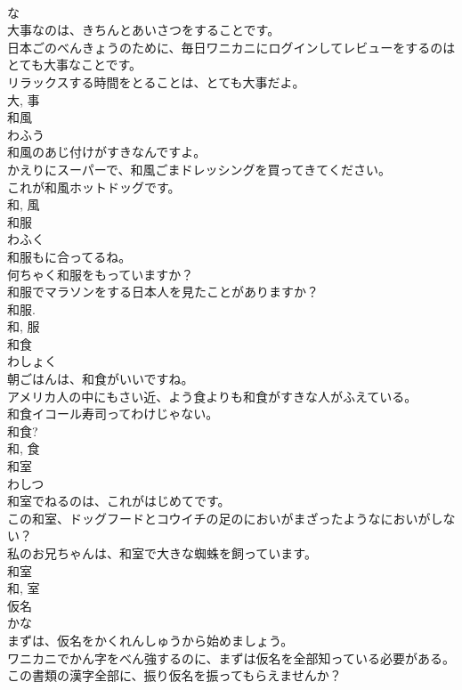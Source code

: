 \documentclass[8pt]{extreport}
\begin{document}
\begin{CJK}{UTF8}{min}
\\	な 
\\	大事なのは、きちんとあいさつをすることです。	
\\	日本ごのべんきょうのために、毎日ワニカニにログインしてレビューをするのはとても大事なことです。	
\\	リラックスする時間をとることは、とても大事だよ。	
\\	大, 事	
\\	和風	
\\	わふう	
\\	和風のあじ付けがすきなんですよ。	
\\	かえりにスーパーで、和風ごまドレッシングを買ってきてください。	
\\	これが和風ホットドッグです。	
\\	和, 風	
\\	和服	
\\	わふく	
\\	和服もに合ってるね。	
\\	何ちゃく和服をもっていますか？	
\\	和服でマラソンをする日本人を見たことがありますか？	
\\	和服.	
\\	和, 服	
\\	和食	
\\	わしょく	
\\	朝ごはんは、和食がいいですね。	
\\	アメリカ人の中にもさい近、よう食よりも和食がすきな人がふえている。	
\\	和食イコール寿司ってわけじゃない。	
\\	和食?
\\	和, 食	
\\	和室	
\\	わしつ	
\\	和室でねるのは、これがはじめてです。	
\\	この和室、ドッグフードとコウイチの足のにおいがまざったようなにおいがしない？	
\\	私のお兄ちゃんは、和室で大きな蜘蛛を飼っています。	
\\	和室 
\\	和, 室	
\\	仮名	
\\	かな	
\\	まずは、仮名をかくれんしゅうから始めましょう。	
\\	ワニカニでかん字をべん強するのに、まずは仮名を全部知っている必要がある。	
\\	この書類の漢字全部に、振り仮名を振ってもらえませんか？	

\end{CJK}
\end{document}
